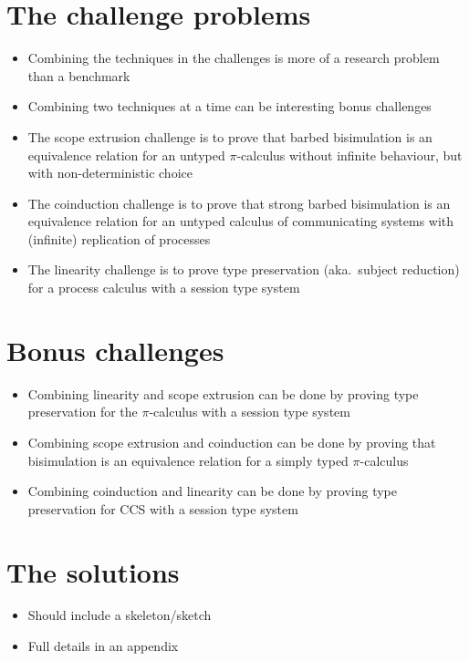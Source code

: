 \documentclass{article}
\begin{document}
\section{The challenge problems}
\begin{itemize}
\item Combining the techniques in the challenges is more of a research problem than a benchmark
\item Combining two techniques at a time can be interesting bonus challenges
\item The scope extrusion challenge is to prove that barbed bisimulation is an equivalence relation for an untyped \(\pi\)-calculus without infinite behaviour, but with non-deterministic choice
\item The coinduction challenge is to prove that strong barbed bisimulation is an equivalence relation for an untyped calculus of communicating systems with (infinite) replication of processes
\item The linearity challenge is to prove type preservation (aka.\ subject reduction) for a process calculus with a session type system
\end{itemize}

\section{Bonus challenges}
\begin{itemize}
\item Combining linearity and scope extrusion can be done by proving type preservation for the \(\pi\)-calculus with a session type system
\item Combining scope extrusion and coinduction can be done by proving that bisimulation is an equivalence relation for a simply typed \(\pi\)-calculus
\item Combining coinduction and linearity can be done by proving type preservation for CCS with a session type system
\end{itemize}

\section{The solutions}
\begin{itemize}
\item Should include a skeleton/sketch
\item Full details in an appendix
\end{itemize}
\end{document}
